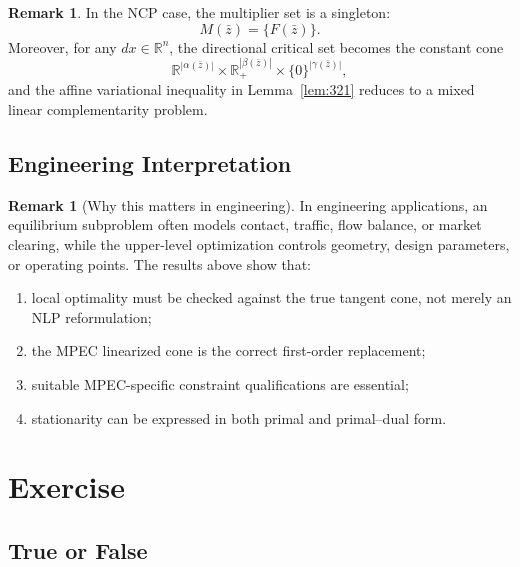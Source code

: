 \documentclass[pdflatex,sn-mathphys-num]{sn-jnl}%
\theoremstyle{definition}
\newtheorem{remark}[theorem]{Remark}
\newcommand{\R}{\mathbb{R}}
\begin{document}
\begin{remark}
In the NCP case, the multiplier set is a singleton:
\[
M(\bar z)=\{F(\bar z)\}.
\]
Moreover, for any $dx\in\R^n$, the directional critical set becomes the
constant cone
\[
\R^{|\alpha(\bar z)|}\times \R_+^{|\beta(\bar z)|}\times \{0\}^{|\gamma(\bar z)|},
\]
and the affine variational inequality in Lemma~\ref{lem:321} reduces to a
mixed linear complementarity problem.
\end{remark}

\subsection{Engineering Interpretation}

\begin{remark}[Why this matters in engineering]
In engineering applications, an equilibrium subproblem often models
contact, traffic, flow balance, or market clearing, while the upper-level
optimization controls geometry, design parameters, or operating points.
The results above show that:
\begin{enumerate}[label=\arabic*.]
\item local optimality must be checked against the true tangent cone,
      not merely an NLP reformulation;
\item the MPEC linearized cone is the correct first-order replacement;
\item suitable MPEC-specific constraint qualifications are essential;
\item stationarity can be expressed in both primal and primal--dual form.
\end{enumerate}
\end{remark}

\section{Exercise}

\subsection{True or False}
\end{document}
